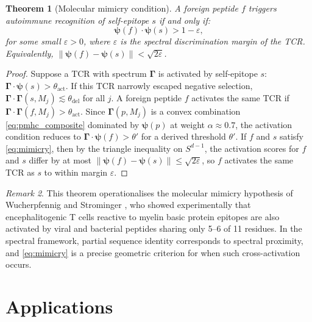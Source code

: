 \documentclass[twocolumn,11pt,a4paper]{article}
\newtheorem{theorem}{Theorem}[section]
\theoremstyle{definition}
\theoremstyle{remark}
\newtheorem{remark}[theorem]{Remark}
\newcommand{\norm}[1]{\left\| #1 \right\|}
\begin{document}
\begin{theorem}[Molecular mimicry condition]
\label{thm:molecular_mimicry}
A foreign peptide $f$ triggers autoimmune recognition of self-epitope $s$
if and only if:
\begin{equation}
  \bm{\psi}(f)\cdot\bm{\psi}(s) > 1 - \varepsilon,
  \label{eq:mimicry}
\end{equation}
for some small $\varepsilon > 0$, where $\varepsilon$ is the
\emph{spectral discrimination margin} of the TCR. Equivalently,
$\norm{\bm{\psi}(f) - \bm{\psi}(s)} < \sqrt{2\varepsilon}$.
\end{theorem}

\begin{proof}
Suppose a TCR with spectrum $\bm{\Gamma}$ is activated by self-epitope $s$:
$\bm{\Gamma}\cdot\bm{\psi}(s) > \theta_{\mathrm{act}}$. If this TCR narrowly
escaped negative selection,
$\bm{\Gamma}\cdot\bm{\Gamma}(s, M_j) \lesssim \theta_{\mathrm{del}}$
for all $j$. A foreign peptide $f$ activates the same TCR if
$\bm{\Gamma}\cdot\bm{\Gamma}(f, M_j) > \theta_{\mathrm{act}}$. Since
$\bm{\Gamma}(p, M_j)$ is a convex combination \eqref{eq:pmhc_composite}
dominated by $\bm{\psi}(p)$ at weight $\alpha \approx 0.7$, the activation
condition reduces to $\bm{\Gamma}\cdot\bm{\psi}(f) > \theta'$ for a derived
threshold $\theta'$. If $f$ and $s$ satisfy \eqref{eq:mimicry}, then by the
triangle inequality on $S^{d-1}$, the activation scores for $f$ and $s$
differ by at most $\norm{\bm{\psi}(f) - \bm{\psi}(s)} \leq \sqrt{2\varepsilon}$,
so $f$ activates the same TCR as $s$ to within margin $\varepsilon$.
\end{proof}

\begin{remark}
This theorem operationalises the molecular mimicry hypothesis of Wucherpfennig
and Strominger \citep{wucherpfennig1995}, who showed experimentally that
encephalitogenic T cells reactive to myelin basic protein epitopes are also
activated by viral and bacterial peptides sharing only 5--6 of 11 residues.
In the spectral framework, partial sequence identity corresponds to spectral
proximity, and \eqref{eq:mimicry} is a precise geometric criterion for when
such cross-activation occurs.
\end{remark}

\section{Applications}
\label{sec:applications}
\end{document}
